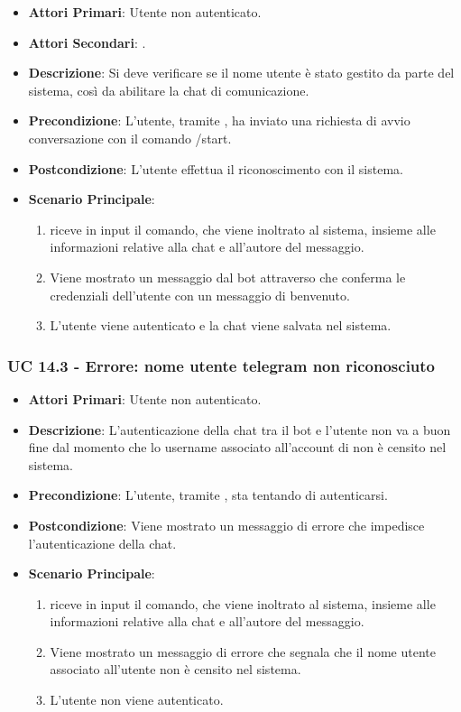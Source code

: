 	\begin{itemize}
		\item \textbf{Attori Primari}: Utente non autenticato.
		\item \textbf{Attori Secondari}: .
		\item \textbf{Descrizione}: Si deve verificare se il nome utente è stato gestito da parte del sistema, così da abilitare la chat di comunicazione.
		\item \textbf{Precondizione}: L'utente, tramite , ha inviato una richiesta di avvio conversazione con il comando /start.
		\item \textbf{Postcondizione}: L'utente effettua il riconoscimento con il sistema.
		\item \textbf{Scenario Principale}:
		\begin{enumerate}
			\item {} riceve in input il comando, che viene inoltrato al sistema, insieme alle informazioni relative alla chat e all'autore del messaggio.
			\item Viene mostrato un messaggio dal bot attraverso  che conferma le credenziali dell'utente con un messaggio di benvenuto.
			\item L'utente viene autenticato e la chat viene salvata nel sistema.
		\end{enumerate}
	\end{itemize}

	\subsubsection{UC 14.3 - Errore: nome utente telegram non riconosciuto}

	\begin{itemize}
		\item \textbf{Attori Primari}: Utente non autenticato.
		\item \textbf{Descrizione}: L'autenticazione della chat tra il bot e l'utente non va a buon fine dal momento che lo username associato all'account di  non è censito nel sistema.
		\item \textbf{Precondizione}: L'utente, tramite , sta tentando di autenticarsi.
		\item \textbf{Postcondizione}: Viene mostrato un messaggio di errore che impedisce l'autenticazione della chat.
		\item \textbf{Scenario Principale}:
		\begin{enumerate}
			\item {} riceve in input il comando, che viene inoltrato al sistema, insieme alle informazioni relative alla chat e all'autore del messaggio.
			\item Viene mostrato un messaggio di errore che segnala che il nome utente associato all'utente  non è censito nel sistema.
			\item L'utente non viene autenticato.
		\end{enumerate}
	\end{itemize}